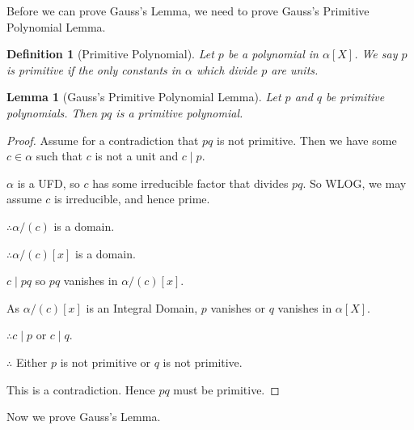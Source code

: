 \documentclass[pagesize=a4]{scrreprt}
\newtheorem{definition}{Definition}
\newtheorem{lemma}{Lemma}
\begin{document}
Before we can prove Gauss's Lemma, we need to prove Gauss's Primitive Polynomial Lemma. 

\begin{definition}[Primitive Polynomial]

    Let $p$ be a polynomial in $\alpha[X]$. We say $p$ is primitive if the only constants in $ \alpha $ which divide $p$ are units. 

\end{definition}


\begin{lemma}[Gauss's Primitive Polynomial Lemma]
    Let $p$ and $q$ be primitive polynomials. Then $pq$ is a primitive polynomial.
\end{lemma}

\begin{proof}
    Assume for a contradiction that $pq$ is not primitive. 
    Then we have some $c \in \alpha$ such that $c$ is not a unit and $c \mid p$. 
   
    $\alpha$ is a UFD, so $c$ has some irreducible factor that divides $pq$. So WLOG, we may assume $c$ is irreducible, and hence prime.

    $\therefore \alpha/(c)$ is a domain.
    
    $\therefore \alpha/(c) [x]$ is a domain. 

    $c \mid pq$ so $pq$ vanishes in $\alpha/(c) [x]$. 

    As $\alpha/(c) [x]$ is an Integral Domain, $p$ vanishes or $q$ vanishes in $\alpha[X]$.

   $\therefore c \mid p$ or $c \mid q$. 
    
   $\therefore$ Either $p$ is not primitive or $q$ is not primitive. 

   This is a contradiction. Hence $pq$ must be primitive. 
  \end{proof}

  Now we prove Gauss's Lemma. 
\end{document}
